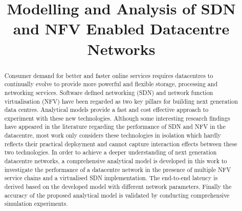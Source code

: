 \documentclass[conference]{IEEEtran}
\begin{document}
\title{Modelling and Analysis of SDN and NFV Enabled Datacentre Networks}

\author{
}
 
\maketitle

\begin{abstract}
Consumer demand for better and faster online services requires datacentres to continually evolve to provide more powerful and flexible storage, processing and networking services. Software defined networking (SDN) and network function virtualisation (NFV) have been regarded as two key pillars for building next generation data centres. Analytical models provide a fast and cost effective approach to experiment with these new technologies. Although some interesting research findings have appeared in the literature regarding the performance of SDN and NFV in the datacentre, most work only considers these technologies in isolation which hardly reflects their practical deployment and cannot capture interaction effects between these two technologies. In order to achieve a deeper understanding of next generation datacentre networks, a comprehensive analytical model is developed in this work to investigate the performance of a datacentre network in the presence of multiple NFV service chains and a virtualised SDN implementation. The end-to-end latency is derived based on the developed model with different network parameters. Finally the accuracy of the proposed analytical model is validated by conducting comprehensive simulation experiments.
\end{abstract}










% 





\end{document}
